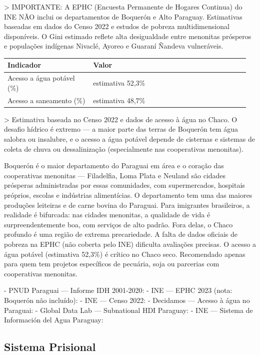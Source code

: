 > IMPORTANTE: A EPHC (Encuesta Permanente de Hogares Continua) do INE NÃO inclui os departamentos de Boquerón e Alto Paraguay. Estimativas baseadas em dados do Censo 2022 e estudos de pobreza multidimensional disponíveis. O Gini estimado reflete alta desigualdade entre menonitas prósperos e populações indígenas Nivaclé, Ayoreo e Guaraní Ñandeva vulneráveis.


{\small
\setlength{\tabcolsep}{3pt}
\renewcommand{\arraystretch}{1.12}
\begin{tabularx}{\linewidth}{>{\raggedright\arraybackslash}p{0.34\linewidth} >{\raggedright\arraybackslash}p{0.62\linewidth}}
\toprule
Indicador & Valor \\
\midrule
Acesso a água potável (\%) & estimativa 52,3\% \\
Acesso a saneamento (\%) & estimativa 48,7\% \\
\bottomrule
\end{tabularx}
}

> Estimativa baseada no Censo 2022 e dados de acesso à água no Chaco. O desafio hídrico é extremo --- a maior parte das terras de Boquerón tem água salobra ou insalubre, e o acesso a água potável depende de cisternas e sistemas de coleta de chuva ou dessalinização (especialmente nas cooperativas menonitas).


Boquerón é o maior departamento do Paraguai em área e o coração das cooperativas menonitas --- Filadelfia, Loma Plata e Neuland são cidades prósperas administradas por essas comunidades, com supermercados, hospitais próprios, escolas e indústrias alimentícias. O departamento tem uma das maiores produções leiteiras e de carne bovina do Paraguai. Para imigrantes brasileiros, a realidade é bifurcada: nas cidades menonitas, a qualidade de vida é surpreendentemente boa, com serviços de alto padrão. Fora delas, o Chaco profundo é uma região de extrema precariedade. A falta de dados oficiais de pobreza na EPHC (não coberta pelo INE) dificulta avaliações precisas. O acesso a água potável (estimativa 52,3\%) é crítico no Chaco seco. Recomendado apenas para quem tem projetos específicos de pecuária, soja ou parcerias com cooperativas menonitas.


- PNUD Paraguai --- Informe IDH 2001-2020: 
- INE --- EPHC 2023 (nota: Boquerón não incluído): 
- INE --- Censo 2022: 
- Decidamos --- Acesso à água no Paraguai: 
- Global Data Lab --- Subnational HDI Paraguay: 
- INE --- Sistema de Información del Agua Paraguay: 


\subsection{Sistema Prisional}



